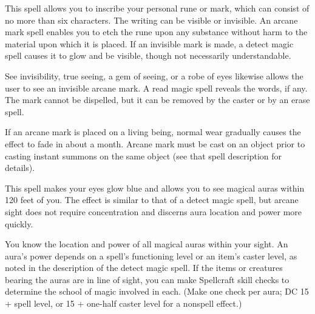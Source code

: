 \begin{multicols}{2}
\begin{small}

\noindent This spell allows you to inscribe your personal rune or mark, which can consist of no more than six characters. The writing can be visible or invisible. An arcane mark spell enables you to etch the rune upon any substance without harm to the material upon which it is placed. If an invisible mark is made, a detect magic spell causes it to glow and be visible, though not necessarily understandable.

\smallskip\noindent See invisibility, true seeing, a gem of seeing, or a robe of eyes likewise allows the user to see an invisible arcane mark. A read magic spell reveals the words, if any. The mark cannot be dispelled, but it can be removed by the caster or by an erase spell.

\smallskip\noindent If an arcane mark is placed on a living being, normal wear gradually causes the effect to fade in about a month.
Arcane mark must be cast on an object prior to casting instant summons on the same object (see that spell description for details).

\noindent This spell makes your eyes glow blue and allows you to see magical auras within 120 feet of you. The effect is similar to that of a detect magic spell, but arcane sight does not require concentration and discerns aura location and power more quickly.

\smallskip\noindent You know the location and power of all magical auras within your sight. An aura's power depends on a spell's functioning level or an item's caster level, as noted in the description of the detect magic spell. If the items or creatures bearing the auras are in line of sight, you can make Spellcraft skill checks to determine the school of magic involved in each. (Make one check per aura; DC 15 + spell level, or 15 + one-half caster level for a nonspell effect.)


\end{small}
\end{multicols}
